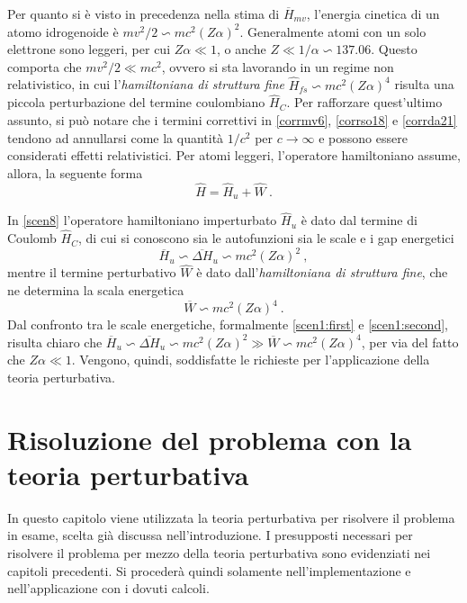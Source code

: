 \documentclass[12pt,a4paper]{report}
\numberwithin{equation}{section}
\numberwithin{section}{chapter}
\begin{document}
	Per quanto si \`e visto in precedenza nella stima di $\overline{H}_{mv}$, l'energia cinetica di un atomo idrogenoide \`e $mv^2/2 \backsim mc^2(Z\alpha)^2$. Generalmente atomi con un solo elettrone sono leggeri, per cui $Z\alpha \ll 1$, o anche $Z \ll 1/\alpha \backsim 137.06$. Questo comporta che $mv^2/2 \ll mc^2$, ovvero si sta lavorando in un regime non relativistico, in cui l'\textit{hamiltoniana di struttura fine} $\widehat{H}_{fs} \backsim mc^2(Z\alpha)^4$ risulta una piccola perturbazione del termine coulombiano $\widehat{H}_C$. Per rafforzare quest'ultimo assunto, si pu\`o notare che i termini correttivi in \eqref{corrmv6}, \eqref{corrso18} e \eqref{corrda21} tendono ad annullarsi come la quantit\`a $1/c^2$ per $c\rightarrow\infty$ e possono essere considerati effetti relativistici. Per atomi leggeri, l'operatore hamiltoniano assume, allora, la seguente forma
	\begin{equation}
	\label{scen8}
	\widehat{H} = \widehat{H}_u + \widehat{W}~.
	\end{equation}
	
	In \eqref{scen8} l'operatore hamiltoniano imperturbato $\widehat{H}_u$ \`e dato dal termine di Coulomb $\widehat{H}_C$, di cui si conoscono sia le autofunzioni sia le scale e i gap energetici
	\begin{equation}
	\label{scen9}
	\overline{H}_u \backsim \overline{\Delta H}_u \backsim mc^2(Z\alpha)^2~,
	\end{equation}
	mentre il termine perturbativo $\widehat{W}$ \`e dato dall'\textit{hamiltoniana di struttura fine}, che ne determina la scala energetica
	\begin{equation}
	\label{scen10}
	\overline{W} \backsim mc^2(Z\alpha)^4~.
	\end{equation}
	Dal confronto tra le scale energetiche, formalmente \eqref{scen1:first} e \eqref{scen1:second}, risulta chiaro che $\overline{H}_u \backsim \overline{\Delta H}_u \backsim mc^2(Z\alpha)^2 \gg \overline{W} \backsim mc^2(Z\alpha)^4$, per via del fatto che $Z\alpha \ll 1$. Vengono, quindi, soddisfatte le richieste per l'applicazione della teoria perturbativa.
	
	\chapter{Risoluzione del problema con la teoria perturbativa}\label{cha:teoper}
	In questo capitolo viene utilizzata la teoria perturbativa per risolvere il problema in esame, scelta gi\`a discussa nell'introduzione. I presupposti necessari per risolvere il problema per mezzo della teoria perturbativa sono evidenziati nei capitoli precedenti. Si proceder\`a quindi solamente nell'implementazione e nell'applicazione con i dovuti calcoli.
	
\end{document}
